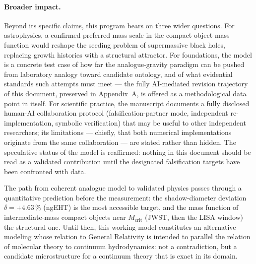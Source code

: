 \documentclass[11pt,a4paper]{article}
\theoremstyle{plain}
\theoremstyle{remark}
\begin{document}
\paragraph{Broader impact.} Beyond its specific claims, this program bears on three wider questions. For astrophysics, a confirmed preferred mass scale in the compact-object mass function would reshape the seeding problem of supermassive black holes, replacing growth histories with a structural attractor. For foundations, the model is a concrete test case of how far the analogue-gravity paradigm \cite{barcelo, volovik} can be pushed from laboratory analogy toward candidate ontology, and of what evidential standards such attempts must meet --- the fully AI-mediated revision trajectory of this document, preserved in Appendix~A, is offered as a methodological data point in itself. For scientific practice, the manuscript documents a fully disclosed human-AI collaboration protocol (falsification-partner mode, independent re-implementation, symbolic verification) that may be useful to other independent researchers; its limitations --- chiefly, that both numerical implementations originate from the same collaboration --- are stated rather than hidden. The speculative status of the model is reaffirmed: nothing in this document should be read as a validated contribution until the designated falsification targets have been confronted with data.

The path from coherent analogue model to validated physics passes through a quantitative prediction before the measurement: the shadow-diameter deviation $\delta = +4.63\,\%$ (ngEHT) is the most accessible target, and the mass function of intermediate-mass compact objects near $M_{\text{crit}}$ (JWST, then the LISA window) the structural one. Until then, this working model constitutes an alternative modeling whose relation to General Relativity is intended to parallel the relation of molecular theory to continuum hydrodynamics: not a contradiction, but a candidate microstructure for a continuum theory that is exact in its domain.
\end{document}
